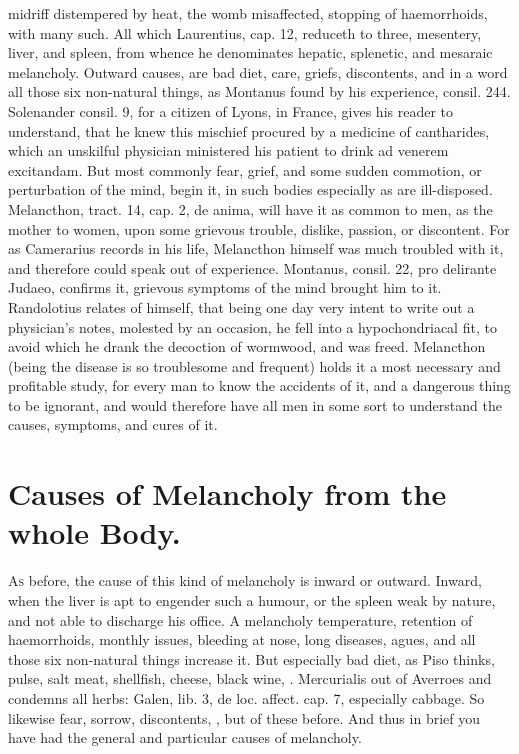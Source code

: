 {{midriff distempered by heat, the womb misaffected, stopping of
haemorrhoids, with many such. All which Laurentius, cap. 12, reduceth
to three, mesentery, liver, and spleen, from whence he denominates
hepatic, splenetic, and mesaraic melancholy. Outward causes, are bad
diet, care, griefs, discontents, and in a word all those six
non-natural things, as Montanus found by his experience, consil. 244.
Solenander consil. 9, for a citizen of Lyons, in France, gives his
reader to understand, that he knew this mischief procured by a medicine
of cantharides, which an unskilful physician ministered his patient to
drink ad venerem excitandam. But most commonly fear, grief, and some
sudden commotion, or perturbation of the mind, begin it, in such bodies
especially as are ill-disposed. Melancthon, tract. 14, cap. 2, de
anima, will have it as common to men, as the mother to women, upon some
grievous trouble, dislike, passion, or discontent. For as Camerarius
records in his life, Melancthon himself was much troubled with it, and
therefore could speak out of experience. \textlatin{Montanus, consil. 22, pro
delirante Judaeo}, confirms it, grievous symptoms of the mind
brought him to it. Randolotius relates of himself, that being one day
very intent to write out a physician's notes, molested by an occasion,
he fell into a hypochondriacal fit, to avoid which he drank the
decoction of wormwood, and was freed. Melancthon (being the
disease is so troublesome and frequent) holds it a most necessary and
profitable study, for every man to know the accidents of it, and a
dangerous thing to be ignorant, and would therefore have all men in
some sort to understand the causes, symptoms, and cures of it.

\section{Causes of Melancholy from the whole Body.}

\lettrine{A}{s} before, the cause of this kind of melancholy is inward or outward.
Inward, when the liver is apt to engender such a humour, or the
spleen weak by nature, and not able to discharge his office. A
melancholy temperature, retention of haemorrhoids, monthly issues,
bleeding at nose, long diseases, agues, and all those six non-natural
things increase it. But especially bad diet, as Piso thinks,
pulse, salt meat, shellfish, cheese, black wine, \etc{}. Mercurialis out of
Averroes and \Avicenna{} condemns all herbs: Galen, lib. 3, de loc.
affect. cap. 7, especially cabbage. So likewise fear, sorrow,
discontents, \etc{}, but of these before. And thus in brief you have had
the general and particular causes of melancholy.

}}
